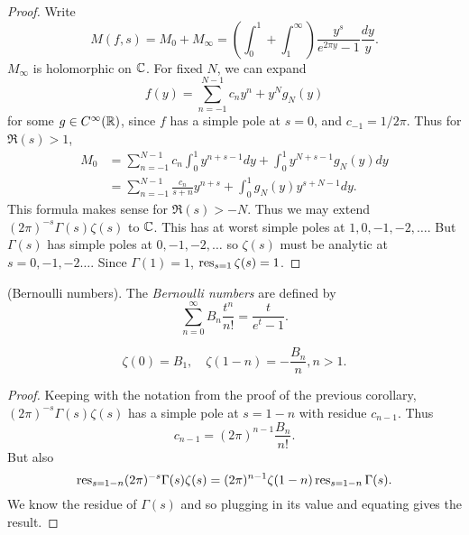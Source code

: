 \documentclass{memoir}
\begin{document}
\begin{proof}
    Write 
    \begin{equation}
        M(f,s) = M_0 + M_\infty = \left(\int_0^1+\int_1^\infty\right) \frac{y^s}{e^{2\pi y}-1}\frac{dy}y.
    \end{equation}
    $M_\infty$ is holomorphic on $\mathbb{C}$.
    For fixed $N$, we can expand 
    \begin{equation}
        f(y) = \sum_{n=-1}^{N-1}c_ny^n + y^Ng_N(y)
    \end{equation}
    for some $g\in C^\infty(\mathbb{R})$,  since $f$ has a simple pole at $s=0$, and $c_{-1} = 1/2\pi$.
    Thus for $\Re(s)>1$,
    \begin{align}
        M_0 &= \sum_{n=-1}^{N-1} c_n\int_0^1y^{n+s-1}dy + \int_0^1y^{N+s-1}g_N(y)dy \nonumber \\
            &= \sum_{n=-1}^{N-1} \frac{c_n}{s+n}y^{n+s} + \int_0^1g_N(y)y^{s+N-1}dy.
    \end{align}
    This formula makes sense for $\Re(s)>-N$.
    Thus we may extend $(2\pi)^{-s}\Gamma(s)\zeta(s)$ to $\mathbb{C}$.
    This has at worst simple poles at $1,0,-1,-2,\dots$.
    But $\Gamma(s)$ has simple poles at $0,-1,-2,\dots$ so $\zeta(s)$ must be analytic at $s=0,-1,-2\dots$.
    Since $\Gamma(1) = 1$, $\operatorname{res}_{s=1}\zeta(s) = 1$.
\end{proof}
\begin{definition}
    (Bernoulli numbers).
    The \textit{Bernoulli numbers} are defined by
    \begin{equation}
        \sum_{n=0}^\infty B_n\frac{t^n}{n!} = \frac t{e^t-1}.
    \end{equation}
\end{definition}
\begin{corollary}
    \begin{equation}
        \zeta(0) = B_1, \quad \zeta(1-n) = -\frac{B_n}n, n>1.
    \end{equation}
\end{corollary}
\begin{proof}
    Keeping with the notation from the proof of the previous corollary, $(2\pi)^{-s}\Gamma(s)\zeta(s)$ has a simple pole at $s=1-n$ with residue $c_{n-1}$.
    Thus
    \begin{equation}
        c_{n-1} = (2\pi)^{n-1}\frac{B_n}{n!}.
    \end{equation}
    But also
    \begin{equation}
        \operatorname{res}_{s=1-n}(2\pi)^{-s}\Gamma(s)\zeta(s) = (2\pi)^{n-1}\zeta(1-n)\operatorname{res}_{s=1-n}\Gamma(s).
    \end{equation}
    We know the residue of $\Gamma(s)$ and so plugging in its value and equating gives the result.
\end{proof}
\end{document}
